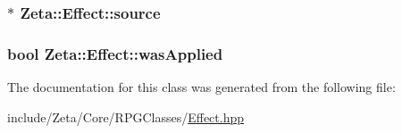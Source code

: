 \hypertarget{classZeta_1_1Effect_aa4bffc23c071f21e72c577c2e16e40ee}{
\subsubsection[{source}]{$\ast$ Zeta\+::\+Effect\+::source\hspace{0.3cm}{\ttfamily [protected]}}}\label{classZeta_1_1Effect_aa4bffc23c071f21e72c577c2e16e40ee}
\hypertarget{classZeta_1_1Effect_a3457ad78b5b7d1c75b5d6116350a89b8}{
\subsubsection[{was\+Applied}]{\setlength{\rightskip}{0pt plus 5cm}bool Zeta\+::\+Effect\+::was\+Applied\hspace{0.3cm}{\ttfamily [private]}}}\label{classZeta_1_1Effect_a3457ad78b5b7d1c75b5d6116350a89b8}


The documentation for this class was generated from the following file\+:\begin{DoxyCompactItemize}
\item 
include/\+Zeta/\+Core/\+R\+P\+G\+Classes/\hyperlink{Effect_8hpp}{Effect.\+hpp}\end{DoxyCompactItemize}
